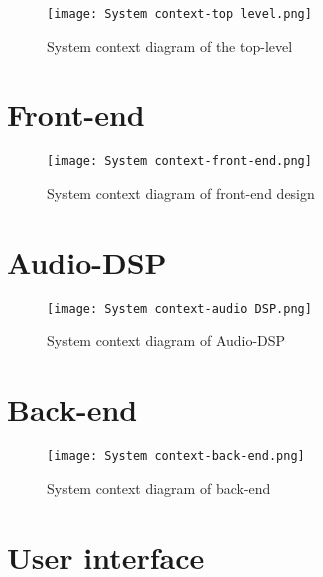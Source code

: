 
\begin{figure}[h]
    \texttt{[image: System context-top level.png]}
    \caption{System context diagram of the top-level}
\end{figure}

\section{Front-end}
\begin{figure}[h]
    \texttt{[image: System context-front-end.png]}
    \caption{System context diagram of front-end design}
\end{figure}

\section{Audio-DSP}
\begin{figure}[h]
    \texttt{[image: System context-audio DSP.png]}
    \caption{System context diagram of Audio-DSP}
\end{figure}

\section{Back-end}
\begin{figure}[h]
    \texttt{[image: System context-back-end.png]}
    \caption{System context diagram of back-end}
\end{figure}

\section{User interface}
